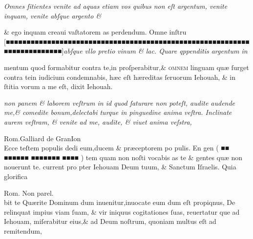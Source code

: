 \documentclass{article}
\begin{document}
{\begin{multicols}{2}
	\columnbreak
	\justifying
	\noindent
	\textit{Omnes ſitientes venite ad aquas etiam vos quibus non eſt argentum, venite inquam, venite abſque argento \&\\}
\end{multicols}
\fontsize{6.25}{7}\selectfont
\vspace{-2.7\baselineskip}
\noindent \& ego inquam creaui vaſtatorem as perdendum. Omne inſtru \hfill[\hfill ■■■■■■■■■■■■■■■■■■■■■■■■■■■■■■■■■■■■■■■■■■■■■■■■■■■■■■■■■■■■■■■■■■■■■■■■■\hfill]\hfill \textit{abſque vllo pretio vinum \& lac. Quare qppenditis argentum in}
\vspace{-1.6\baselineskip}
\begin{multicols}{2}
	\fontsize{6.25}{7}\selectfont
	\justifying
	\noindent mentum quod formabitur contra te,in proſperabitur,\& \textsc{ omnem} linguam qu\ae{} ſurget contra tein iudicium\linebreak
	condemnabis, h\ae{}c eſt h\ae{}reditas ſeruorum Iehouah, \& in ſtitia vorum a me eſt, dixit Iehouah.

	\columnbreak
	\justifying
	\noindent
	\textit{non panem \& laborem veſtrum in id quod ſaturare non poteſt, audite audende me,\& comedite bonum,delectabi\linebreak
		turque in pinguedine anima veſtra. Inclinate aurem veſtram, \& venite ad me, audite, \& viuet anima veſstra,
	}
\end{multicols}
\setlength{\columnsep}{3mm}
\begin{multicols}{4}
	\tiny
	\centering
	Rom.Galliard de GranIon\\
	\fontsize{4}{5}\selectfont
	\justifying
	\noindent \quad Ecce teſtem populis dedi eum,ducem \& pr\ae{}ceptorem po\linebreak
	pulis. En gen ( ■■ ■■■■■■ ■■■■■■■ ■■■■ ) tem quam non\linebreak
	noſti vocabis as te \& gentes qu\ae{} non nouerunt te. current pro\linebreak
	pter Iehouam Deum tuum, \& Sanctum Iſraelis. Quia glorifica

	\columnbreak

	\centering
	\tiny
	Rom. Non parel.\\
	\fontsize{3}{3.75}\selectfont
	\justifying
	\noindent bit te Qu\ae{}rite Dominum dum inuenitur,inuocate eum dum eſt propiqnus,\linebreak
	De relinquat impius viam ſuam, \& vir iniquus cogitationes ſuas, reuertatur\linebreak
	que ad Iehouam, miſerabitur eius,\& ad Deum noſtrum, quoniam multus eſt\linebreak
	ad remitendum,


\end{multicols}}
\end{document}
